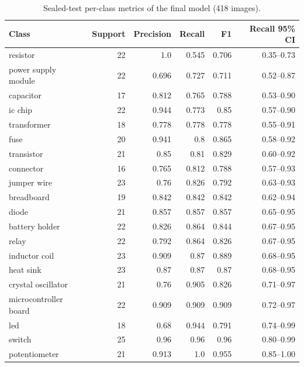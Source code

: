 \begin{table}[t]
\centering\small
\caption{Sealed-test per-class metrics of the final model (418 images).}
\label{tab:sealed_test_per_class}
\begin{tabular}{lrrrrr}
\toprule
Class & Support & Precision & Recall & F1 & Recall 95\% CI \\
\midrule
resistor & 22 & 1.0 & 0.545 & 0.706 & 0.35–0.73 \\
power supply module & 22 & 0.696 & 0.727 & 0.711 & 0.52–0.87 \\
capacitor & 17 & 0.812 & 0.765 & 0.788 & 0.53–0.90 \\
ic chip & 22 & 0.944 & 0.773 & 0.85 & 0.57–0.90 \\
transformer & 18 & 0.778 & 0.778 & 0.778 & 0.55–0.91 \\
fuse & 20 & 0.941 & 0.8 & 0.865 & 0.58–0.92 \\
transistor & 21 & 0.85 & 0.81 & 0.829 & 0.60–0.92 \\
connector & 16 & 0.765 & 0.812 & 0.788 & 0.57–0.93 \\
jumper wire & 23 & 0.76 & 0.826 & 0.792 & 0.63–0.93 \\
breadboard & 19 & 0.842 & 0.842 & 0.842 & 0.62–0.94 \\
diode & 21 & 0.857 & 0.857 & 0.857 & 0.65–0.95 \\
battery holder & 22 & 0.826 & 0.864 & 0.844 & 0.67–0.95 \\
relay & 22 & 0.792 & 0.864 & 0.826 & 0.67–0.95 \\
inductor coil & 23 & 0.909 & 0.87 & 0.889 & 0.68–0.95 \\
heat sink & 23 & 0.87 & 0.87 & 0.87 & 0.68–0.95 \\
crystal oscillator & 21 & 0.76 & 0.905 & 0.826 & 0.71–0.97 \\
microcontroller board & 22 & 0.909 & 0.909 & 0.909 & 0.72–0.97 \\
led & 18 & 0.68 & 0.944 & 0.791 & 0.74–0.99 \\
switch & 25 & 0.96 & 0.96 & 0.96 & 0.80–0.99 \\
potentiometer & 21 & 0.913 & 1.0 & 0.955 & 0.85–1.00 \\
\bottomrule
\end{tabular}
\end{table}
